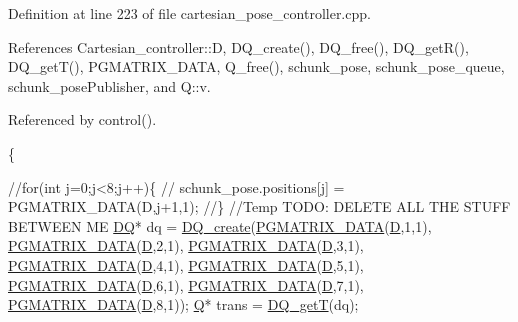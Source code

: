 Definition at line 223 of file cartesian\-\_\-pose\-\_\-controller.\-cpp.



References Cartesian\-\_\-controller\-::\-D, D\-Q\-\_\-create(), D\-Q\-\_\-free(), D\-Q\-\_\-get\-R(), D\-Q\-\_\-get\-T(), P\-G\-M\-A\-T\-R\-I\-X\-\_\-\-D\-A\-T\-A, Q\-\_\-free(), schunk\-\_\-pose, schunk\-\_\-pose\-\_\-queue, schunk\-\_\-pose\-Publisher, and Q\-::v.



Referenced by control().


\begin{DoxyCode}
                                         \{

        \textcolor{comment}{//for(int j=0;j<8;j++)\{}
        \textcolor{comment}{//      schunk\_pose.positions[j] = PGMATRIX\_DATA(D,j+1,1);}
        \textcolor{comment}{//\}}
        \textcolor{comment}{//Temp TODO: DELETE ALL THE STUFF BETWEEN ME}
        \hyperlink{structDQ}{DQ}* dq = \hyperlink{dualquaternion_8h_a8b1057516bdc2c0cb14127791cf356cf}{DQ\_create}(\hyperlink{gmatrix_8h_a7333180c47234295df2bd7b09ac00da8}{PGMATRIX\_DATA}(\hyperlink{classCartesian__controller_a8c470b652ce436d8e48f126073fc2593}{D},1,1),
                        \hyperlink{gmatrix_8h_a7333180c47234295df2bd7b09ac00da8}{PGMATRIX\_DATA}(\hyperlink{classCartesian__controller_a8c470b652ce436d8e48f126073fc2593}{D},2,1),
                        \hyperlink{gmatrix_8h_a7333180c47234295df2bd7b09ac00da8}{PGMATRIX\_DATA}(\hyperlink{classCartesian__controller_a8c470b652ce436d8e48f126073fc2593}{D},3,1),
                        \hyperlink{gmatrix_8h_a7333180c47234295df2bd7b09ac00da8}{PGMATRIX\_DATA}(\hyperlink{classCartesian__controller_a8c470b652ce436d8e48f126073fc2593}{D},4,1),
                        \hyperlink{gmatrix_8h_a7333180c47234295df2bd7b09ac00da8}{PGMATRIX\_DATA}(\hyperlink{classCartesian__controller_a8c470b652ce436d8e48f126073fc2593}{D},5,1),
                        \hyperlink{gmatrix_8h_a7333180c47234295df2bd7b09ac00da8}{PGMATRIX\_DATA}(\hyperlink{classCartesian__controller_a8c470b652ce436d8e48f126073fc2593}{D},6,1),
                        \hyperlink{gmatrix_8h_a7333180c47234295df2bd7b09ac00da8}{PGMATRIX\_DATA}(\hyperlink{classCartesian__controller_a8c470b652ce436d8e48f126073fc2593}{D},7,1),
                        \hyperlink{gmatrix_8h_a7333180c47234295df2bd7b09ac00da8}{PGMATRIX\_DATA}(\hyperlink{classCartesian__controller_a8c470b652ce436d8e48f126073fc2593}{D},8,1));
        \hyperlink{structQ}{Q}* trans = \hyperlink{dualquaternion_8h_a80e2f2aded851388d4f18d486a0b9455}{DQ\_getT}(dq);

\end{DoxyCode}
